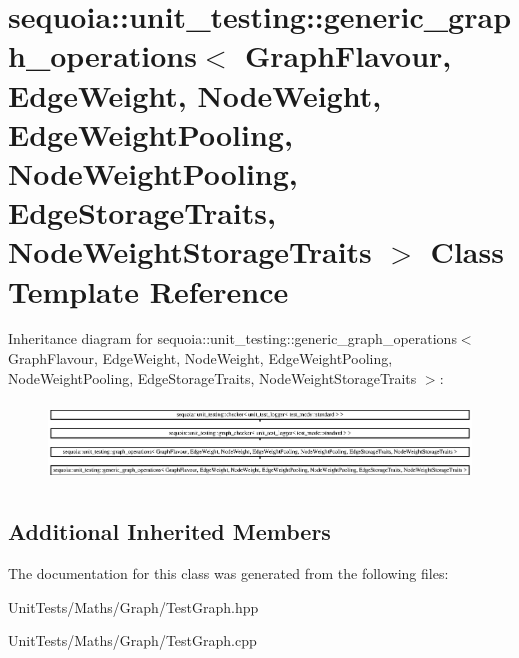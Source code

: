 \hypertarget{classsequoia_1_1unit__testing_1_1generic__graph__operations}{}\section{sequoia\+::unit\+\_\+testing\+::generic\+\_\+graph\+\_\+operations$<$ Graph\+Flavour, Edge\+Weight, Node\+Weight, Edge\+Weight\+Pooling, Node\+Weight\+Pooling, Edge\+Storage\+Traits, Node\+Weight\+Storage\+Traits $>$ Class Template Reference}
\label{classsequoia_1_1unit__testing_1_1generic__graph__operations}
Inheritance diagram for sequoia\+::unit\+\_\+testing\+::generic\+\_\+graph\+\_\+operations$<$ Graph\+Flavour, Edge\+Weight, Node\+Weight, Edge\+Weight\+Pooling, Node\+Weight\+Pooling, Edge\+Storage\+Traits, Node\+Weight\+Storage\+Traits $>$\+:\begin{figure}[H]
\begin{center}
\leavevmode
\includegraphics[height=2.143541cm]{classsequoia_1_1unit__testing_1_1generic__graph__operations}
\end{center}
\end{figure}
\subsection*{Additional Inherited Members}


The documentation for this class was generated from the following files\+:\begin{DoxyCompactItemize}
\item 
Unit\+Tests/\+Maths/\+Graph/Test\+Graph.\+hpp\item 
Unit\+Tests/\+Maths/\+Graph/Test\+Graph.\+cpp\end{DoxyCompactItemize}
